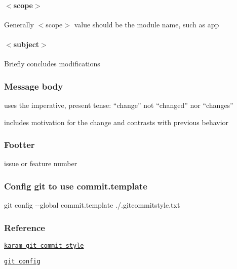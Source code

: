 \paragraph*{$<$scope$>$}

Generally {\ttfamily $<$scope$>$} value should be the module name, such as {\ttfamily app}

\paragraph*{$<$subject$>$}

Briefly concludes modifications

\subsubsection*{Message body}


\begin{DoxyItemize}
\item uses the imperative, present tense\+: “change” not “changed” nor “changes”
\item includes motivation for the change and contrasts with previous behavior
\end{DoxyItemize}

\subsubsection*{Footter}

issue or feature number

\subsubsection*{Config git to use {\ttfamily commit.\+template}}

{\ttfamily git config -\/-\/global commit.\+template ./.gitcommitstyle.\+txt}

\subsubsection*{Reference}


\begin{DoxyItemize}
\item \href{http://karma-runner.github.io/4.0/dev/git-commit-msg.html}{\tt karam git commit style}
\item \href{https://git-scm.com/book/en/v2/Customizing-Git-Git-Configuration}{\tt git config}
\end{DoxyItemize}

